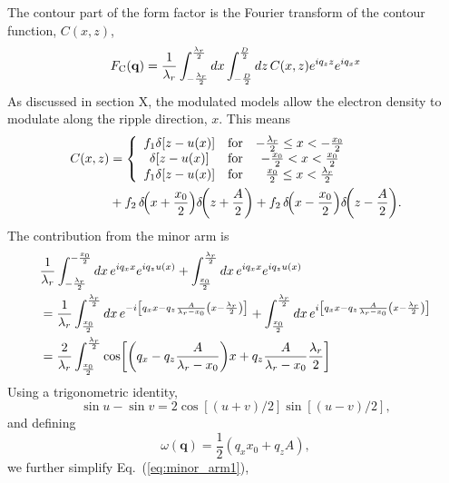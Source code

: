 The contour part of the form factor is the Fourier transform of the contour
function, $C(x,z)$,
\[
  F_\mathrm{C}(\mathbf{q}) = \frac{1}{\lambda_r}
  \int_{-\frac{\lambda_r}{2}}^{\frac{\lambda_r}{2}}\mathop{dx}
  \int_{-\frac{D}{2}}^\frac{D}{2}\mathop{dz} 
  C(x,z) e^{iq_zz} e^{iq_xx}
\] 
As discussed in section X, the modulated models allow
the electron density to modulate along the ripple direction, $x$. This means
\begin{align}
  C(x,z) &= \left\{
  \begin{array}{ccc}
    f_1\delta[z-u(x)] & \text{for} & -\frac{\lambda_r}{2} \leq x < -\frac{x_0}{2} \\
    \delta[z-u(x)] & \text{for} & -\frac{x_0}{2} < x < \frac{x_0}{2} \\
    f_1\delta[z-u(x)] & \text{for} & \frac{x_0}{2} \leq x < \frac{\lambda_r}{2} \\    
  \end{array}
  \right. \nonumber\\
  &+ f_2\,\delta\!\mathopen{}\left( x+\frac{x_0}{2} \right)\mathclose{}\delta\!\mathopen{}\left( z+\frac{A}{2} \right)\mathclose{} 
   + f_2\,\delta\!\mathopen{}\left( x-\frac{x_0}{2} \right)\mathclose{}\delta\!\mathopen{}\left( z-\frac{A}{2} \right)\mathclose{}.
\end{align}
The contribution from the minor arm is
\begin{align}
  & \frac{1}{\lambda_r}
  \int_{-\frac{\lambda_r}{2}}^{-\frac{x_0}{2}}\mathop{dx} e^{iq_xx} e^{iq_zu(x)}
  + \int_{\frac{x_0}{2}}^{\frac{\lambda_r}{2}}\mathop{dx} e^{iq_xx} e^{iq_zu(x)} \nonumber\\
  &= \frac{1}{\lambda_r}
     \int_{\frac{x_0}{2}}^{\frac{\lambda_r}{2}}\mathop{dx} 
     e^{-i\left[q_xx-q_z\frac{A}{\lambda_r-x_0}\left(x-\frac{\lambda_r}{2}\right)\right]}
     + \int_{\frac{x_0}{2}}^{\frac{\lambda_r}{2}}\mathop{dx} 
     e^{i\left[q_xx-q_z\frac{A}{\lambda_r-x_0}\left(x-\frac{\lambda_r}{2}\right)\right]} \nonumber\\
  &= \frac{2}{\lambda_r}
     \int_{\frac{x_0}{2}}^{\frac{\lambda_r}{2}}   
     \cos\mathopen{}\left[ \mathopen{}\left( q_x-q_z\frac{A}{\lambda_r-x_0} \right)\mathclose{}x
                 +q_z\frac{A}{\lambda_r-x_0}\frac{\lambda_r}{2} \right]\mathclose{} \label{eq:minor_arm1}
\end{align}
Using a trigonometric identity, 
\[
  \sin u-\sin v = 2\cos[(u+v)/2]\sin[(u-v)/2],
\]
and defining 
\begin{equation}
  \omega(\mathbf{q}) = \frac{1}{2}\left(q_xx_0 + q_zA\right),
\end{equation}
we further simplify Eq.~(\ref{eq:minor_arm1}),
